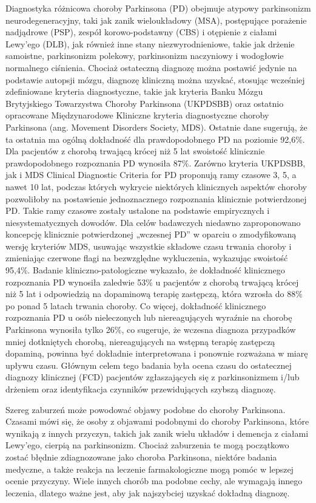 Diagnostyka różnicowa choroby Parkinsona (PD) obejmuje atypowy parkinsonizm neurodegeneracyjny, taki jak zanik wieloukładowy (MSA),
postępujące porażenie nadjądrowe (PSP), zespół korowo-podstawny (CBS) i otępienie z ciałami Lewy'ego (DLB), jak również inne stany niezwyrodnieniowe,
takie jak drżenie samoistne, parkinsonizm polekowy, parkinsonizm naczyniowy i wodogłowie normalnego ciśnienia.
Chociaż ostateczną diagnozę można postawić jedynie na podstawie autopsji mózgu, diagnozę kliniczną można uzyskać,
stosując wcześniej zdefiniowane kryteria diagnostyczne, takie jak kryteria Banku Mózgu Brytyjskiego Towarzystwa Choroby Parkinsona (UKPDSBB)
oraz ostatnio opracowane Międzynarodowe Kliniczne kryteria diagnostyczne choroby Parkinsona (ang. Movement Disorders Society, MDS).
Ostatnie dane sugerują, że ta ostatnia ma ogólną dokładność dla prawdopodobnego PD na poziomie 92,6\%.
Dla pacjentów z chorobą trwającą krócej niż 5 lat swoistość klinicznie prawdopodobnego rozpoznania PD wynosiła 87\%.
Zarówno kryteria UKPDSBB, jak i MDS Clinical Diagnostic Criteria for PD proponują ramy czasowe 3, 5, a nawet 10 lat,
podczas których wykrycie niektórych klinicznych aspektów choroby pozwoliłoby na postawienie jednoznacznego rozpoznania klinicznie potwierdzonej PD.
Takie ramy czasowe zostały ustalone na podstawie empirycznych i niesystematycznych dowodów.
Dla celów badawczych niedawno zaproponowano koncepcję klinicznie potwierdzonej „wczesnej PD” w oparciu o zmodyfikowaną wersję kryteriów MDS,
usuwając wszystkie składowe czasu trwania choroby i zmieniając czerwone flagi na bezwzględne wykluczenia, wykazując swoistość 95,4\%.
Badanie kliniczno-patologiczne wykazało, że dokładność klinicznego rozpoznania PD wynosiła zaledwie 53\% u pacjentów z chorobą trwającą krócej
niż 5 lat i odpowiedzią na dopaminową terapię zastępczą, która wzrosła do 88\% po ponad 5 latach trwania choroby. Co więcej,
dokładność klinicznego rozpoznania PD u osób nieleczonych lub niereagujących wyraźnie na chorobę Parkinsona wynosiła tylko 26\%, co
sugeruje, że wczesna diagnoza przypadków mniej dotkniętych chorobą, niereagujących na wstępną terapię zastępczą dopaminą, powinna być
dokładnie interpretowana i ponownie rozważana w miarę upływu czasu.
Głównym celem tego badania była ocena czasu do ostatecznej diagnozy klinicznej (FCD) pacjentów zgłaszających się z parkinsonizmem i/lub
drżeniem oraz identyfikacja czynników przewidujących szybszą diagnozę.


Szereg zaburzeń może powodować objawy podobne do choroby Parkinsona.
Czasami mówi się, że osoby z objawami podobnymi do choroby Parkinsona, które wynikają z innych przyczyn, takich jak zanik wielu układów i demencja z ciałami Lewy'ego, cierpią na parkinsonizm.
Chociaż zaburzenia te mogą początkowo zostać błędnie zdiagnozowane jako choroba Parkinsona, niektóre badania medyczne, a także reakcja na leczenie farmakologiczne mogą pomóc w lepszej ocenie przyczyny.
Wiele innych chorób ma podobne cechy, ale wymagają innego leczenia, dlatego ważne jest, aby jak najszybciej uzyskać dokładną diagnozę\cite{National_Institute_on_Aging_2022}.


